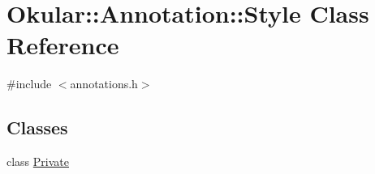 \hypertarget{classOkular_1_1Annotation_1_1Style}{\section{Okular\+:\+:Annotation\+:\+:Style Class Reference}
\label{classOkular_1_1Annotation_1_1Style}
}


{\ttfamily \#include $<$annotations.\+h$>$}

\subsection*{Classes}
\begin{DoxyCompactItemize}
\item 
class \hyperlink{classAnnotation_1_1Style_1_1Private}{Private}
\end{DoxyCompactItemize}
